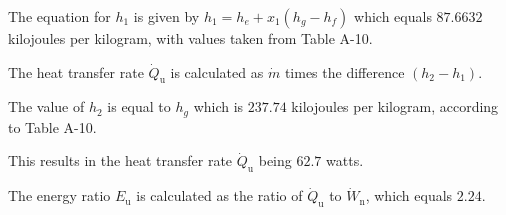 The equation for \( h_1 \) is given by \( h_1 = h_e + x_1 (h_g - h_f) \) which equals \( 87.6632 \) kilojoules per kilogram, with values taken from Table A-10.

The heat transfer rate \( \dot{Q}_{\text{u}} \) is calculated as \( \dot{m} \) times the difference \( (h_2 - h_1) \).

The value of \( h_2 \) is equal to \( h_g \) which is \( 237.74 \) kilojoules per kilogram, according to Table A-10.

This results in the heat transfer rate \( \dot{Q}_{\text{u}} \) being \( 62.7 \) watts.

The energy ratio \( E_{\text{u}} \) is calculated as the ratio of \( \dot{Q}_{\text{u}} \) to \( \dot{W}_{\text{n}} \), which equals \( 2.24 \).